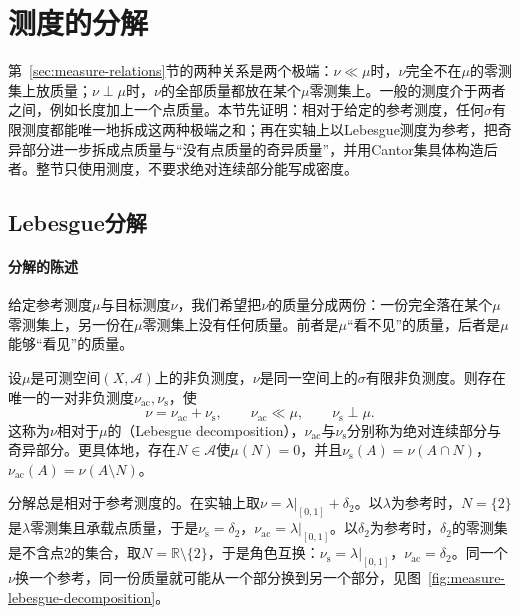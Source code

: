 \section{测度的分解}
\label{sec:measure-decomposition}

第~\ref{sec:measure-relations}节的两种关系是两个极端：$\nu\ll\mu$时，$\nu$完全不在$\mu$的零测集上放质量；$\nu\perp\mu$时，$\nu$的全部质量都放在某个$\mu$零测集上。一般的测度介于两者之间，例如长度加上一个点质量。本节先证明：相对于给定的参考测度，任何$\sigma$有限测度都能唯一地拆成这两种极端之和；再在实轴上以Lebesgue测度为参考，把奇异部分进一步拆成点质量与“没有点质量的奇异质量”，并用Cantor集具体构造后者。整节只使用测度，不要求绝对连续部分能写成密度。

\subsection{Lebesgue分解}
\label{sec:measure-lebesgue-decomposition}

\paragraph{分解的陈述}
给定参考测度$\mu$与目标测度$\nu$，我们希望把$\nu$的质量分成两份：一份完全落在某个$\mu$零测集上，另一份在$\mu$零测集上没有任何质量。前者是$\mu$“看不见”的质量，后者是$\mu$能够“看见”的质量。

\begin{theorem}[Lebesgue分解]
\label{thm:measure-lebesgue-decomposition}
设$\mu$是可测空间$(X,\mathcal A)$上的非负测度，$\nu$是同一空间上的$\sigma$有限非负测度。则存在唯一的一对非负测度$\nu_{\mathrm{ac}},\nu_{\mathrm{s}}$，使
\[
 \nu=\nu_{\mathrm{ac}}+\nu_{\mathrm{s}},\qquad \nu_{\mathrm{ac}}\ll\mu,\qquad \nu_{\mathrm{s}}\perp\mu .
\]
这称为$\nu$相对于$\mu$的（Lebesgue decomposition），$\nu_{\mathrm{ac}}$与$\nu_{\mathrm{s}}$分别称为绝对连续部分与奇异部分。更具体地，存在$N\in\mathcal A$使$\mu(N)=0$，并且$\nu_{\mathrm{s}}(A)=\nu(A\cap N)$，$\nu_{\mathrm{ac}}(A)=\nu(A\setminus N)$。
\end{theorem}

分解总是相对于参考测度的。在实轴上取$\nu=\lambda|_{[0,1]}+\delta_2$。以$\lambda$为参考时，$N=\{2\}$是$\lambda$零测集且承载点质量，于是$\nu_{\mathrm{s}}=\delta_2$，$\nu_{\mathrm{ac}}=\lambda|_{[0,1]}$。以$\delta_2$为参考时，$\delta_2$的零测集是不含点$2$的集合，取$N=\mathbb R\setminus\{2\}$，于是角色互换：$\nu_{\mathrm{s}}=\lambda|_{[0,1]}$，$\nu_{\mathrm{ac}}=\delta_2$。同一个$\nu$换一个参考，同一份质量就可能从一个部分换到另一个部分，见图~\ref{fig:measure-lebesgue-decomposition}。

